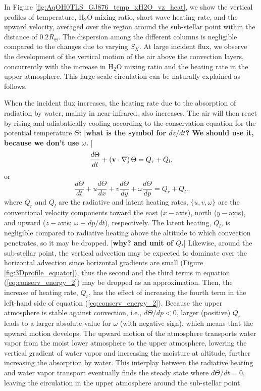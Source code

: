 \documentclass[11pt,numberedappendix,twocolappendix,]{emulateapj}
\def\water{H$_2$O }
\def\memo#1{\color{red}$[${\bf #1}$]$ \color{black}}
\begin{document}
In Figure \ref{fig:AqOH0TLS_GJ876_temp_xH2O_vz_heat}, we show the vertical  profiles of temperature, \water mixing ratio, short wave heating rate, and the upward velocity, averaged over the region around the sub-stellar point within the distance of $0.2R_{\oplus }$. 
The dispersion among the different columns is negligible compared to the changes due to varying $S_X$. 
At large incident flux, we observe the development of the vertical motion of the air above the convection layers, concurrently with the increase in \water mixing ratio and the heating rate in the upper atmosphere. 
This large-scale circulation can be naturally explained as follows. 

When the incident flux increases, the heating rate due to the absorption of radiation by water, mainly in near-infrared, also increases. 
The air will then react by rising and adiabatically cooling according to the conservation equation for the potential temperature $\Theta $:
\memo{what is the symbol for $dz/dt$? We should use it, because we don't use $\omega $. }
\begin{equation}
\frac{d\Theta }{dt} + ( {\bf v} \cdot \nabla ) \, \Theta = Q_r + Q_l, \label{eq:conserv_energy}
\end{equation}
or
\begin{equation}
\frac{d\Theta }{dt} + u \frac{d\Theta }{dx} + v \frac{d\Theta }{dy} + \omega \frac{d\Theta }{dp} = Q_r + Q_l. \label{eq:conserv_energy_2}
\end{equation}
where $Q_r$ and $Q_l$ are the radiative and latent heating rates, $\{ u, v, \omega \}$ are the conventional velocity components toward the east ($x-$axis), north ($y-$axis), and upward ($z-$axis; $\omega \equiv  dp/dt$), respectively. 
The latent heating, $Q_l$, is negligible compared to radiative heating above the altitude to which convection penetrates, so it may be dropped. \memo{why? and unit of $Q$.}
Likewise, around the sub-stellar point, the vertical advection may be expected to dominate over the horizontal advection since horizontal gradients are small (Figure \ref{fig:3Dprofile_equator}), thus the second and the third terms in equation (\ref{eq:conserv_energy_2}) may be dropped as an approximation. 
Then, the increase of heating rate, $Q_r$, has the effect of increasing the fourth term in the left-hand side of equation (\ref{eq:conserv_energy_2}). 
Because the upper atmosphere is stable against convection, i.e., $d \Theta / d p < 0 $, larger (positive) $Q_r$ leads to a larger absolute value for $\omega $ (with negative sign), which means that the upward motion develops. 
The upward motion of the atmosphere transports water vapor from the moist lower atmosphere to the upper atmosphere, lowering the vertical gradient of water vapor and increasing the moisture at altitude, further increasing the absorption by water. 
This interplay between the radiative heating and water vapor transport eventually finds the steady state where $d\Theta/dt = 0$, leaving the  circulation in the upper atmosphere around the sub-stellar point. 
\end{document}
